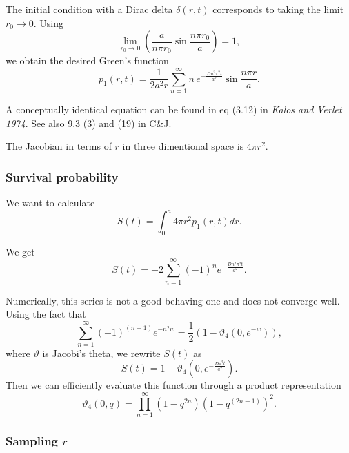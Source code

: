 \documentclass[english]{article}
\begin{document}
The initial condition with a Dirac delta $\delta(r,t)$ corresponds
to taking the limit $r_{0}\rightarrow0$. Using \begin{equation}
\lim_{r_{0}\rightarrow0}\left(\frac{a}{n\pi r_{0}}\sin\frac{n\pi r_{0}}{a}\right)=1,\end{equation}
 we obtain the desired Green's function \begin{equation}
p_{1}(r,t)=\frac{1}{2a^{2}r}\sum_{n=1}^{\infty}n\, e^{-\frac{Dn^{2}\pi^{2}t}{a^{2}}}\sin\frac{n\pi r}{a}.\end{equation}


A conceptually identical equation can be found in eq (3.12) in \textit{Kalos
and Verlet 1974}. See also 9.3 (3) and (19) in C\&J.

The Jacobian in terms of $r$ in three dimentional space is $4\pi r^{2}$.


\subsubsection{Survival probability}

We want to calculate \begin{equation}
S(t)=\int_{0}^{a}4\pi r^{2}p_{1}(r,t)dr.\end{equation}


We get \begin{equation}
S(t)=-2\sum_{n=1}^{\infty}(-1)^{n}e^{-\frac{Dn^{2}\pi^{2}t}{a^{2}}}.\end{equation}


Numerically, this series is not a good behaving one and does not converge
well. Using the fact that \begin{equation}
\sum_{n=1}^{\infty}(-1)^{(n-1)}e^{-n^{2}w}=\frac{1}{2}(1-\vartheta_{4}(0,e^{-w})),\end{equation}
 where $\vartheta$ is Jacobi's theta, we rewrite $S(t)$ as \begin{equation}
S(t)=1-\vartheta_{4}(0,e^{-\frac{D\pi^{2}t}{a^{2}}}).\end{equation}
 Then we can efficiently evaluate this function through a product
representation \begin{equation}
\vartheta_{4}(0,q)=\prod_{n=1}^{\infty}(1-q^{2n})(1-q^{(2n-1)})^{2}.\end{equation}



\subsubsection{Sampling $r$}
\end{document}
